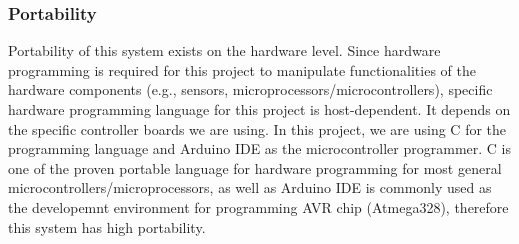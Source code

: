 \subsubsection{Portability}
Portability of this system exists on the hardware level. Since hardware programming is required for this project to manipulate functionalities of the hardware components (e.g., sensors, microprocessors/microcontrollers), specific hardware programming language for this project is host-dependent. It depends on the specific controller boards we are using. In this project, we are using C for the programming language and Arduino IDE as the microcontroller programmer. C is one of the proven portable language for hardware programming for most general microcontrollers/microprocessors, as well as Arduino IDE is commonly used as the developemnt environment for programming AVR chip (Atmega328), therefore this system has high portability.







